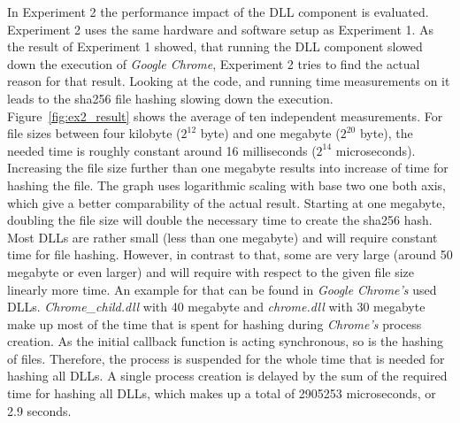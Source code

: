 In Experiment 2 the performance impact of the \gls{DLL} component is evaluated. Experiment 2 uses the same hardware and software setup as Experiment 1. As the result of Experiment 1 showed, that running the \gls{DLL} component slowed down the execution of \emph{Google Chrome}, Experiment 2 tries to find the actual reason for that result. Looking at the code, and running time measurements on it leads to the sha256 file hashing slowing down the execution. Figure~\ref{fig:ex2_result} shows the average of ten independent measurements. For file sizes between four kilobyte ($2^{12}$ byte) and one megabyte ($2^{20}$ byte), the needed time is roughly constant around 16 milliseconds ($2^{14}$ microseconds). Increasing the file size further than one megabyte results into increase of time for hashing the file. The graph uses logarithmic scaling with base two one both axis, which give a better comparability of the actual result. Starting at one megabyte, doubling the file size will double the necessary time to create the sha256 hash. Most \glspl{DLL} are rather small (less than one megabyte) and will require constant time for file hashing. However, in contrast to that, some are very large (around 50 megabyte or even larger) and will require with respect to the given file size linearly more time. An example for that can be found in \emph{Google Chrome's} used \glspl{DLL}. \emph{Chrome\_child.dll} with 40 megabyte and \emph{chrome.dll} with 30 megabyte make up most of the time that is spent for hashing during \emph{Chrome's} process creation. As the initial callback function  is acting synchronous, so is the hashing of files. Therefore, the process is suspended for the whole time that is needed for hashing all \glspl{DLL}. A single process creation is delayed by the sum of the required time for hashing all \glspl{DLL}, which makes up a total of 2905253 microseconds, or 2.9 seconds.

